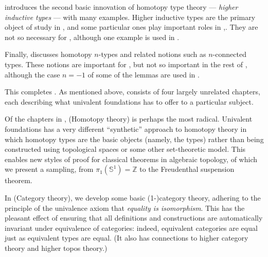 \documentclass[12pt]{article}
\newcommand{\Sn}{\mathbb{S}}
\newcommand{\Z}{\ensuremath{\mathbb{Z}}\xspace}
\begin{document}
 introduces the second basic innovation of homotopy type theory --- \emph{higher inductive types} --- with many examples.
Higher inductive types are the primary object of study in , and some particular ones play important roles in ,.
They are not so necessary for , although one example is used in .

Finally,  discusses homotopy $n$-types and related notions such as $n$-connected types.
These notions are important for , but not so important in the rest of , although the case $n=-1$ of some of the lemmas are used in .

This completes .
As mentioned above,  consists of four largely unrelated chapters, each describing what univalent foundations has to offer to a particular subject.

Of the chapters in ,  (Homotopy theory) is perhaps the most radical.
Univalent foundations has a very different ``synthetic'' approach to homotopy theory in which homotopy types are the basic objects (namely, the types) rather than being constructed using topological spaces or some other set-theoretic model.
This enables new styles of proof for classical theorems in algebraic topology, of which we present a sampling, from $\pi_1(\Sn^1)=\Z$ to the Freudenthal suspension theorem.

In  (Category theory), we develop some basic (1-)category theory, adhering to the principle of the univalence axiom that \emph{equality is isomorphism}.
This has the pleasant effect of ensuring that all definitions and constructions are automatically invariant under equivalence of categories: indeed, equivalent categories are equal just as equivalent types are equal.
(It also has connections to higher category theory and higher topos theory.)
\end{document}
